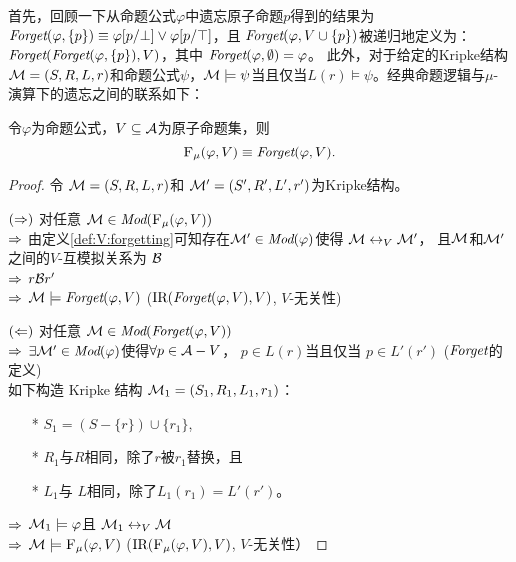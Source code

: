 首先，回顾一下从命题公式$\varphi$中遗忘原子命题$p$得到的结果为$\textit{Forget}(\varphi, \{p\})\equiv \varphi[p/\bot] \vee \varphi[p/\top]$，且 $\textit{Forget}(\varphi, V\cup \{p\})$被递归地定义为： $\textit{Forget}(\textit{Forget}(\varphi, \{p\}),V)$，其中 $\textit{Forget}(\varphi, \emptyset) = \varphi$。
此外，对于给定的Kripke结构${\cal M} = (S, R, L, r)$和命题公式$\psi$，${\cal M} \models  \psi$当且仅当$L(r) \models \psi$。经典命题逻辑与$\mu$-演算下的遗忘之间的联系如下：
\begin{theorem}\label{thm:PL:CTL}
	令$\varphi$为命题公式，$V\subseteq {\cal A}$为原子命题集，则
	\[
	{\textsc{F}_{\textsc{$\mu$}}}(\varphi, V) \equiv \textit{Forget}(\varphi, V).
	\]
\end{theorem}
\begin{proof}
	令 ${\cal M} = (S, R, L, r)$和 ${\cal M}' = (S', R', L', r')$为Kripke结构。
	
	$(\Rightarrow)$ 对任意 ${\cal M} \in \textit{Mod}({\textsc{F}_{\textsc{$\mu$}}}(\varphi, V))$ \\
	$\Rightarrow$ 由定义\ref{def:V:forgetting}可知存在${\cal M}' \in \textit{Mod}(\varphi)$使得 ${\cal M} \leftrightarrow_V {\cal M}'$， %
	且${\cal M}$和${\cal M}'$之间的$V$-互模拟关系为 ${\cal B}$\\
	$\Rightarrow$ $r {\cal B} r'$ \\
	$\Rightarrow$ ${\cal M} \models \textit{Forget}(\varphi, V)$ \hfill ($\textrm{IR}(\textit{Forget}(\varphi, V),V)$, $V$-无关性)
	
	$(\Leftarrow)$ 对任意 ${\cal M} \in \textit{Mod}(\textit{Forget}(\varphi, V))$ \\
	$\Rightarrow$ $\exists {\cal M}' \in\textit{Mod}(\varphi)$使得$\forall p \in {\cal A}-V$， $p \in L(r)$当且仅当 $p \in L'(r')$ \hfill ($\textit{Forget}$的定义)\\
	
	如下构造 Kripke 结构 ${\cal M}_1 = (S_1, R_1, L_1, r_1)$：
	\begin{itemize}
		\item[*] $S_1 = (S - \{r\}) \cup \{r_1\}$,
		\item[*] $R_1$与$R$相同，除了$r$被$r_1$替换，且
		\item[*] $L_1$与 $L$相同，除了$L_1(r_1) = L'(r')$。
	\end{itemize}
	$\Rightarrow$ ${\cal M}_1 \models \varphi$且 ${\cal M}_1 \leftrightarrow_V {\cal M}$\\
	$\Rightarrow$ ${\cal M} \models {\textsc{F}_{\textsc{$\mu$}}}(\varphi, V)$ \hfill ($\textrm{IR}({\textsc{F}_{\textsc{$\mu$}}}(\varphi, V), V)$, $V$-无关性）
\end{proof}

